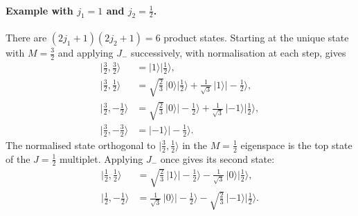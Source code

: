 \documentclass[11pt,a4paper]{article}
\begin{document}
\paragraph{Example with $j_1=1$ and $j_2=\tfrac12$.}
There are $(2j_1+1)(2j_2+1)=6$ product states. Starting at the
unique state with $M=\tfrac32$ and applying $J_-$ successively,
with normalisation at each step, gives
\begin{align*}
    |\tfrac32,\tfrac32\rangle &= |1\rangle|\tfrac12\rangle,\\
    |\tfrac32,\tfrac12\rangle &=
        \sqrt{\tfrac23}\,|0\rangle|\tfrac12\rangle
        +\tfrac{1}{\sqrt3}\,|1\rangle|-\tfrac12\rangle,\\
    |\tfrac32,-\tfrac12\rangle &=
        \sqrt{\tfrac23}\,|0\rangle|-\tfrac12\rangle
        +\tfrac{1}{\sqrt3}\,|-1\rangle|\tfrac12\rangle,\\
    |\tfrac32,-\tfrac32\rangle &= |-1\rangle|-\tfrac12\rangle.
\end{align*}
The normalised state orthogonal to $|\tfrac32,\tfrac12\rangle$
in the $M=\tfrac12$ eigenspace is the top state of the
$J=\tfrac12$ multiplet. Applying $J_-$ once gives its second state:
\begin{align*}
    |\tfrac12,\tfrac12\rangle &=
        \sqrt{\tfrac23}\,|1\rangle|-\tfrac12\rangle
        -\tfrac{1}{\sqrt3}\,|0\rangle|\tfrac12\rangle,\\
    |\tfrac12,-\tfrac12\rangle &=
        \tfrac{1}{\sqrt3}\,|0\rangle|-\tfrac12\rangle
        -\sqrt{\tfrac23}\,|-1\rangle|\tfrac12\rangle.
\end{align*}

\begin{center}
\end{center}
\end{document}
